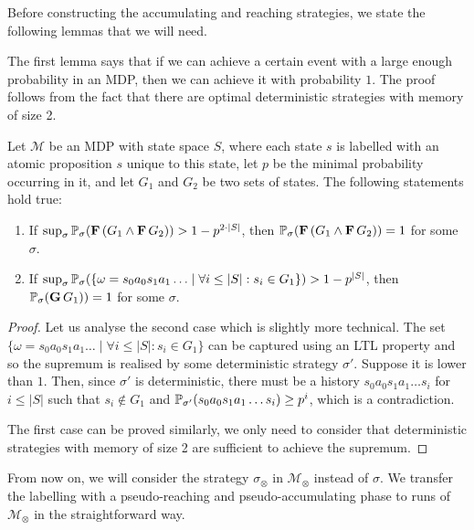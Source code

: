 \documentclass[a4paper,UKenglish]{lipics}
\newcommand{\mdp}{\mathcal{M}}
\newcommand{\G}{\mathbf{G}\,}
\newcommand{\F}{\mathbf{F}\,}
\renewcommand{\Pr}[3][]{\ifblank{#1}{\mathbb{P}_{#2}}{\mathbb{P}^{#1}_{#2}}(#3)}
\begin{document}
Before constructing the accumulating and reaching strategies, we state the following  lemmas that we will need.


The first lemma says that if we can achieve a certain event with a large enough probability in an MDP, then we can achieve it with probability $1$. The proof follows from the fact that there are optimal deterministic strategies with memory of size 2.
\begin{lemma}\label{lemma:pone}
	Let $\mdp$ be an MDP with state space $S$, where each state $s$ is labelled with an atomic proposition $s$ unique to this state, let $p$ be the minimal probability occurring in it, and let $G_1$ and $G_2$ be two sets of states. The following statements hold true:
	\begin{enumerate}
		\item  If $\sup_\sigma \Pr{\sigma}{\F (G_1 \land \F G_2)} > 1 - p^{2\cdot|S|}$, then $\Pr{\sigma}{\F (G_1 \land \F G_2)}= 1$ for some $\sigma$.
		\item  If $\sup_\sigma \Pr{\sigma}{\{\omega = s_0a_0s_1a_1\ldots \mid \forall i\le |S| : s_i \in G_1 \}} > 1 - p^{|S|}$, then $\Pr{\sigma}{\G G_1)}= 1$ for some $\sigma$.
	\end{enumerate}
\end{lemma}
\begin{proof}
	Let us analyse the second case which is slightly more technical.
	The set $\{\omega = s_0a_0s_1a_1\ldots \mid \forall i\le |S| : s_i \in G_1 \}$ can be captured using an LTL property
	and so the supremum is realised by some deterministic strategy $\sigma'$. Suppose it is lower than $1$.
	Then, since $\sigma'$ is deterministic, there must be a history $s_0 a_0 s_1 a_1\ldots s_i$ for $i\le |S|$
	such that $s_i\not\in G_1$ and $\Pr{\sigma'}{s_0 a_0 s_1 a_1\ldots s_i} \ge p^{i}$, which is a contradiction.
	
	The first case can be proved similarly, we only need to consider that deterministic strategies with memory of size 2 are
	sufficient to achieve the supremum.
\end{proof}




From now on, we will consider the strategy $\sigma_\otimes$ in $\mdp_\otimes$ instead of $\sigma$. We transfer the labelling with a pseudo-reaching and pseudo-accumulating phase to runs of $\mdp_\otimes$ in the straightforward way.
\end{document}
